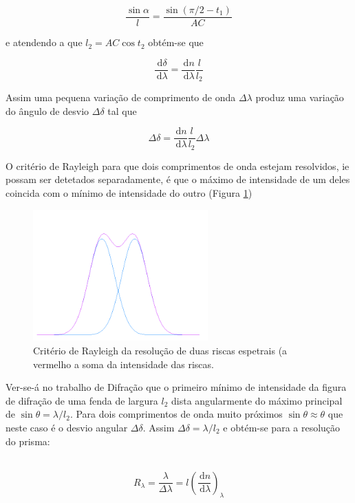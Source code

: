 \documentclass[a4paper,12pt]{article}  %
\newcommand{\ud}{\,\mathrm{d}}
\begin{document}
\begin{equation}
	\label{eq:sin_alpha}
	\frac{\sin \alpha}{l}= \frac{\sin (\pi/2 - t_1)} {AC}
\end{equation}

e atendendo a que $l_2= AC \cos t_2$  obtém-se que 

\begin{equation}
	\label{eq:delt_lamd}
	\frac{\ud \delta}{\ud \lambda}  =  \frac{\ud n}{\ud \lambda} \frac{l}{l_2}
\end{equation}

Assim uma pequena variação de comprimento de onda $\Delta \lambda$ produz uma variação do ângulo de desvio $\Delta \delta$  tal que 

\begin{equation}
	\label{eq:Delt_delta}
	\Delta \delta =  \frac{\ud n}{\ud \lambda} \frac{l}{l_2} \Delta \lambda 
\end{equation}

O critério de Rayleigh para que dois comprimentos de onda estejam resolvidos, ie possam ser detetados separadamente, é que o máximo de intensidade de um deles coincida com o mínimo de intensidade do outro (Figura \ref{fig:gauss})

\begin{figure}[ht]  \centering 
	\includegraphics[width=0.6\textwidth]{gauss}
	\caption{Critério de Rayleigh da resolução de duas riscas espetrais (a vermelho a soma da intensidade das riscas. \label{fig:gauss}} 
\end{figure}

Ver-se-á no trabalho de Difração que o primeiro mínimo de intensidade da figura de difração de uma fenda de largura $l_2$ dista angularmente do máximo principal de  $\sin \theta = \lambda/l_2$.
Para dois comprimentos de onda muito próximos $\sin  \theta \approx \theta $ que neste caso é o desvio angular $\Delta \delta$. Assim $\Delta \delta= \lambda / l_2$ e obtém-se para a resolução do prisma: 

~\begin{equation}
	\label{eq:resolup}
	R_\lambda  =  \frac{\lambda}{\Delta \lambda} = l \left(\frac{\ud n}{\ud \lambda} \right )_\lambda 
\end{equation}
\end{document}
